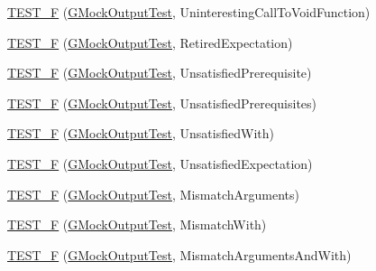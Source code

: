 \begin{DoxyCompactItemize}
\item 
\mbox{\hyperlink{_obj__test_2lib_2googletest-release-1_88_81_2googlemock_2test_2gmock__output__test___8cc_ad6bc4a5b1d635a65363653eff36f6f0c}{T\+E\+S\+T\+\_\+F}} (\mbox{\hyperlink{class_g_mock_output_test}{G\+Mock\+Output\+Test}}, Uninteresting\+Call\+To\+Void\+Function)
\item 
\mbox{\hyperlink{_obj__test_2lib_2googletest-release-1_88_81_2googlemock_2test_2gmock__output__test___8cc_a887f8f9cf09ffea984dcdb87c692c745}{T\+E\+S\+T\+\_\+F}} (\mbox{\hyperlink{class_g_mock_output_test}{G\+Mock\+Output\+Test}}, Retired\+Expectation)
\item 
\mbox{\hyperlink{_obj__test_2lib_2googletest-release-1_88_81_2googlemock_2test_2gmock__output__test___8cc_aab78247f3f1aa1b95feb21150d8e7643}{T\+E\+S\+T\+\_\+F}} (\mbox{\hyperlink{class_g_mock_output_test}{G\+Mock\+Output\+Test}}, Unsatisfied\+Prerequisite)
\item 
\mbox{\hyperlink{_obj__test_2lib_2googletest-release-1_88_81_2googlemock_2test_2gmock__output__test___8cc_aa8df8651de0f2d9f7d1dd765eec89998}{T\+E\+S\+T\+\_\+F}} (\mbox{\hyperlink{class_g_mock_output_test}{G\+Mock\+Output\+Test}}, Unsatisfied\+Prerequisites)
\item 
\mbox{\hyperlink{_obj__test_2lib_2googletest-release-1_88_81_2googlemock_2test_2gmock__output__test___8cc_a3e14c0f9607348fdca074ccc6589fbdd}{T\+E\+S\+T\+\_\+F}} (\mbox{\hyperlink{class_g_mock_output_test}{G\+Mock\+Output\+Test}}, Unsatisfied\+With)
\item 
\mbox{\hyperlink{_obj__test_2lib_2googletest-release-1_88_81_2googlemock_2test_2gmock__output__test___8cc_a662a66a60e7b302feb2dfa4a6b59bf98}{T\+E\+S\+T\+\_\+F}} (\mbox{\hyperlink{class_g_mock_output_test}{G\+Mock\+Output\+Test}}, Unsatisfied\+Expectation)
\item 
\mbox{\hyperlink{_obj__test_2lib_2googletest-release-1_88_81_2googlemock_2test_2gmock__output__test___8cc_a0e3e9858cc7be4771edbe0f346f304f4}{T\+E\+S\+T\+\_\+F}} (\mbox{\hyperlink{class_g_mock_output_test}{G\+Mock\+Output\+Test}}, Mismatch\+Arguments)
\item 
\mbox{\hyperlink{_obj__test_2lib_2googletest-release-1_88_81_2googlemock_2test_2gmock__output__test___8cc_a6e68cce05dc47eea2b0376a1ce4baa23}{T\+E\+S\+T\+\_\+F}} (\mbox{\hyperlink{class_g_mock_output_test}{G\+Mock\+Output\+Test}}, Mismatch\+With)
\item 
\mbox{\hyperlink{_obj__test_2lib_2googletest-release-1_88_81_2googlemock_2test_2gmock__output__test___8cc_a4cea140a4bc751ea563614b827496a96}{T\+E\+S\+T\+\_\+F}} (\mbox{\hyperlink{class_g_mock_output_test}{G\+Mock\+Output\+Test}}, Mismatch\+Arguments\+And\+With)

\end{DoxyCompactItemize}
